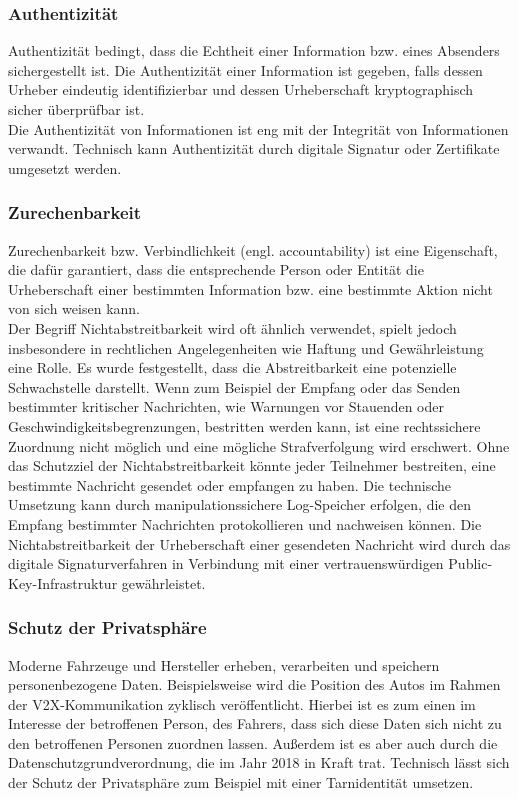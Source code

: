 \subsubsection{Authentizität}
\glqq  Authentizität bedingt, dass die Echtheit einer Information bzw. eines Absenders sichergestellt ist. Die Authentizität einer Information ist gegeben, falls dessen Urheber eindeutig identifizierbar und dessen Urheberschaft kryptographisch sicher überprüfbar ist.
\grqq{} \cite[7]{Wurm.2022} \\
Die Authentizität von Informationen ist eng mit der Integrität von Informationen verwandt. Technisch kann Authentizität durch digitale Signatur oder Zertifikate umgesetzt werden.

\subsubsection{Zurechenbarkeit}
\glqq Zurechenbarkeit bzw. Verbindlichkeit (engl. accountability) ist eine Eigenschaft, die dafür garantiert, dass die entsprechende Person oder Entität die Urheberschaft einer bestimmten Information bzw. eine bestimmte Aktion nicht von sich weisen kann.
\grqq{} \cite[8]{Wurm.2022} \\
Der Begriff Nichtabstreitbarkeit wird oft ähnlich verwendet, spielt jedoch insbesondere in rechtlichen Angelegenheiten wie Haftung und Gewährleistung eine Rolle. Es wurde festgestellt, dass die Abstreitbarkeit eine potenzielle Schwachstelle darstellt. Wenn zum Beispiel der Empfang oder das Senden bestimmter kritischer Nachrichten, wie Warnungen vor Stauenden oder Geschwindigkeitsbegrenzungen, bestritten werden kann, ist eine rechtssichere Zuordnung nicht möglich und eine mögliche Strafverfolgung wird erschwert. Ohne das Schutzziel der Nichtabstreitbarkeit könnte jeder Teilnehmer bestreiten, eine bestimmte Nachricht gesendet oder empfangen zu haben. Die technische Umsetzung kann durch manipulationssichere Log-Speicher erfolgen, die den Empfang bestimmter Nachrichten protokollieren und nachweisen können. Die Nichtabstreitbarkeit der Urheberschaft einer gesendeten Nachricht wird durch das digitale Signaturverfahren in Verbindung mit einer vertrauenswürdigen Public-Key-Infrastruktur gewährleistet. \cite[8]{Wurm.2022}

\subsubsection{Schutz der Privatsphäre}
Moderne Fahrzeuge und Hersteller erheben, verarbeiten und speichern personenbezogene Daten. Beispielsweise wird die Position des Autos im Rahmen der \ac{V2X}-Kommunikation zyklisch veröffentlicht. Hierbei ist es zum einen im Interesse der betroffenen Person, des Fahrers, dass sich diese Daten sich nicht zu den betroffenen Personen zuordnen lassen. Außerdem ist es aber auch durch die Datenschutzgrundverordnung, die im Jahr 2018 in Kraft trat. Technisch lässt sich der Schutz der Privatsphäre zum Beispiel mit einer Tarnidentität umsetzen.


